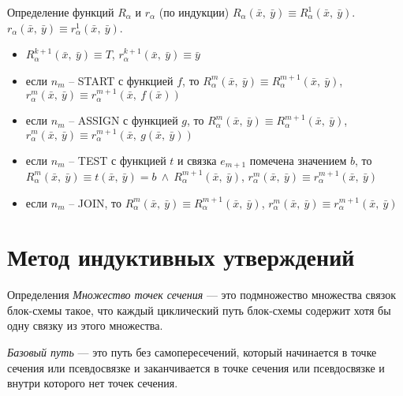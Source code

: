 \documentclass[hyperref={unicode=true}]{beamer}
\begin{document}
	\begin{frame}{Определение функций $R_\alpha$ и $r_\alpha$ (по индукции)}
	$R_\alpha (\bar{x},~\bar{y}) \equiv R_\alpha^1 (\bar{x},~\bar{y})$.
	$r_\alpha (\bar{x},~\bar{y}) \equiv r_\alpha^1 (\bar{x},~\bar{y})$.

	\begin{itemize}
		\item $R_\alpha^{k+1} (\bar{x},~\bar{y}) \equiv T$, $r_\alpha^{k+1} (\bar{x},~\bar{y}) \equiv \bar{y}$
        \item если $n_m$ -- START с функцией $f$, то $R_\alpha^m (\bar{x},~\bar{y}) \equiv R_\alpha^{m+1}(\bar{x},~\bar{y})$, $r_\alpha^m(\bar{x},~\bar{y}) \equiv r_\alpha^{m+1}(\bar{x},~f(\bar{x}))$
		\item если $n_m$ -- ASSIGN с функцией $g$, то $R_\alpha^m (\bar{x},~\bar{y}) \equiv R_\alpha^{m+1} (\bar{x},~\bar{y})$, $r_\alpha^m (\bar{x},~\bar{y}) \equiv r_\alpha^{m+1} (\bar{x},~g(\bar{x},~\bar{y}))$
		\item если $n_m$ -- TEST с функцией $t$ и связка $e_{m+1}$ помечена значением $b$, то $R_\alpha^m (\bar{x},~\bar{y}) \equiv t(\bar{x},~\bar{y}) = b~\land~R_\alpha^{m+1} (\bar{x},~\bar{y})$, $r_\alpha^m (\bar{x},~\bar{y}) \equiv r_\alpha^{m+1} (\bar{x},~\bar{y}) $
		\item если $n_m$ -- JOIN, то $R_\alpha^m (\bar{x},~\bar{y}) \equiv R_\alpha^{m+1} (\bar{x},~\bar{y})$, $r_\alpha^m (\bar{x},~\bar{y}) \equiv r_\alpha^{m+1} (\bar{x},~\bar{y}) $
	\end{itemize}
	\end{frame}

	\section{Метод индуктивных утверждений}

    \begin{frame}{Определения} 
	\emph{Множество точек сечения} --- это подмножество множества связок блок-схемы
    такое, что каждый циклический путь блок-схемы содержит хотя бы одну связку
    из этого множества.

    \bigskip

	\emph{Базовый путь} --- это путь без самопересечений, который начинается в
    точке сечения или псевдосвязке и заканчивается в точке сечения или
    псевдосвязке и внутри которого нет точек сечения.
    \end{frame}
\end{document}
